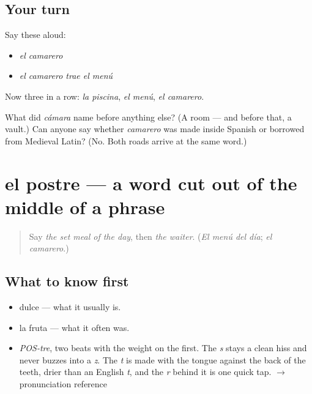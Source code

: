 \subsection*{Your turn}
Say these aloud:

\begin{itemize}
\raggedright
  \item \emph{el camarero}
  \item \emph{el camarero trae el menú}
\end{itemize}

Now three in a row: \emph{la piscina}, \emph{el menú}, \emph{el camarero}.

\begin{tcolorbox}[breakable,colback=teal!4,colframe=teal!35!black,title={Before you move on}]
What did \emph{cámara} name before anything else? (A room — and before that, a vault.) Can anyone say whether \emph{camarero} was made inside Spanish or borrowed from Medieval Latin? (No. Both roads arrive at the same word.)
\end{tcolorbox}
\section[el postre]{el postre — a word cut out of the middle of a phrase}

\label{lesson:ES-C391-postre}



\begin{quote}
Say \emph{the set meal of the day}, then \emph{the waiter}. (\emph{El menú del día}; \emph{el camarero}.)
\end{quote}

\subsection*{What to know first}
\begin{itemize}
\raggedright
  \item dulce — what it usually is.
  \item la fruta — what it often was.
\end{itemize}

\begin{sounds}
\begin{itemize}
\raggedright
  \item \emph{POS-tre}, two beats with the weight on the first. The \emph{s} stays a clean hiss and never buzzes into a \emph{z}. The \emph{t} is made with the tongue against the back of the teeth, drier than an English \emph{t}, and the \emph{r} behind it is one quick tap. $\to$ pronunciation reference
\end{itemize}
\end{sounds}

